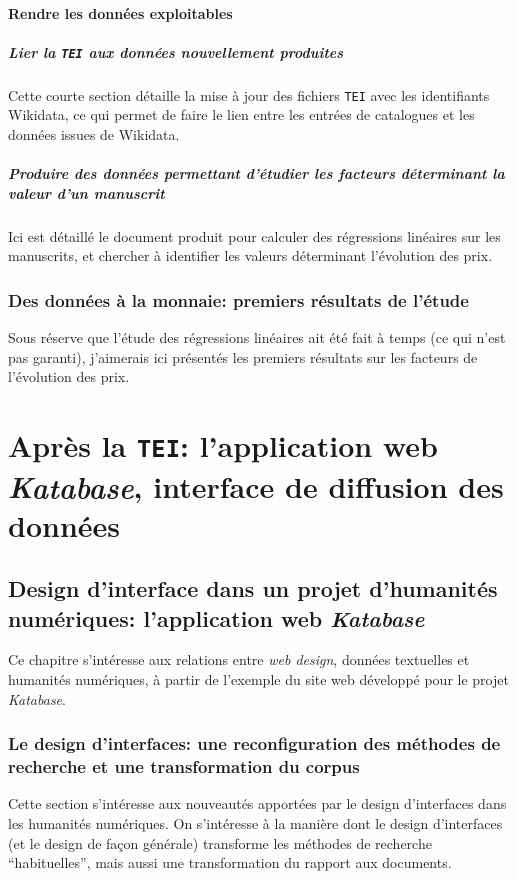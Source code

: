\documentclass[a4paper, 12pt, twoside]{book}
\newcommand{\ktb}{\textit{Katabase}}
\newcommand{\tei}{\texttt{TEI}}
\begin{document}
\subsection{Rendre les données exploitables}
\subsubsection{Lier la \tei{} aux données nouvellement produites}
Cette courte section détaille la mise à jour des fichiers \tei{} avec les identifiants Wikidata, ce qui permet de faire le lien entre les entrées de catalogues et les données issues de Wikidata.

\subsubsection{Produire des données permettant d'étudier les facteurs déterminant la valeur d'un manuscrit}
Ici est détaillé le document produit pour calculer des régressions linéaires sur les manuscrits, et chercher à identifier les valeurs déterminant l'évolution des prix.

\section{Des données à la monnaie: premiers résultats de l'étude}
Sous réserve que l'étude des régressions linéaires ait été fait à temps (ce qui n'est pas garanti), j'aimerais ici présentés les premiers résultats sur les facteurs de l'évolution des prix.


\part{Après la \tei{}: l'application web \textit{Katabase}, interface de diffusion des données}
\chapter{Design d'interface dans un projet d'humanités numériques: l'application web \textit{Katabase}}
Ce chapitre s'intéresse aux relations entre \textit{web design}, données textuelles et humanités numériques, à partir de l'exemple du site web développé pour le projet \ktb{}.

\section{Le design d'interfaces: une reconfiguration des méthodes de recherche et une transformation du corpus}
Cette section s'intéresse aux nouveautés apportées par le design d'interfaces dans les humanités numériques. On s'intéresse à la manière dont le design d'interfaces (et le design de façon générale) transforme les méthodes de recherche \enquote{habituelles}, mais aussi une transformation du rapport aux documents.
\end{document}
